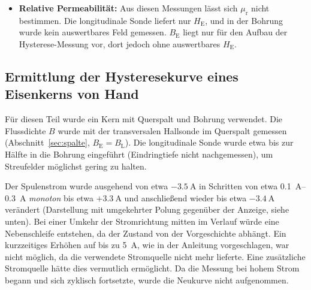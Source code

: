 \documentclass[a4paper,11pt]{article}
\begin{document}
\begin{itemize}
        sind nur durch wenige Punkte aufgelöst, und unmittelbar neben dem Maximum
        fällt die Kurve zwischen $-5{,}5$ und $\SI{-5}{\centi\meter}$ um bis zu etwa
        \SI{44}{\milli\tesla\per\centi\meter} ab. Ein Positionsfehler von
        $\SI{0.05}{\centi\meter}$ entspräche dort etwa $\SI{2}{\milli\tesla}$. Das
        wahre Maximum kann außerdem zwischen zwei Messpunkten liegen. Das ändert
        nichts am Gesamtbild. Da die Kernlänge nicht bestimmt wurde, kann die
        Lage der Maxima relativ zu den Kernenden nicht quantitativ diskutiert
        werden.
  \item \textbf{Relative Permeabilität:} Aus diesen Messungen lässt sich
        $\mu_\mathrm{r}$ nicht bestimmen. Die longitudinale Sonde liefert nur
        $H_\mathrm{E}$, und in der Bohrung wurde kein auswertbares Feld
        gemessen. $B_\mathrm{E}$ liegt nur für den Aufbau der
        Hysterese-Messung vor, dort jedoch ohne auswertbares $H_\mathrm{E}$.
\end{itemize}

\subsection{Ermittlung der Hysteresekurve eines Eisenkerns \glqq von Hand\grqq}
\label{sec:hyst}
Für diesen Teil wurde ein Kern mit Querspalt und Bohrung verwendet.
Die Flussdichte $B$ wurde mit der transversalen Hallsonde im Querspalt gemessen
(Abschnitt~\ref{sec:spalte}, $B_\mathrm{E}=B_\mathrm{L}$). Die longitudinale Sonde
wurde etwa bis zur Hälfte in die Bohrung eingeführt (Eindringtiefe nicht
nachgemessen), um Streufelder möglichst gering zu halten.

Der Spulenstrom wurde ausgehend von etwa $-\SI{3.5}{\ampere}$ in Schritten von
etwa \SIrange{0.1}{0.3}{\ampere} \emph{monoton} bis etwa $+\SI{3.3}{\ampere}$ und
anschließend wieder bis etwa $-\SI{3.4}{\ampere}$ verändert (Darstellung mit
umgekehrter Polung gegenüber der Anzeige, siehe unten). Bei einer Umkehr der
Stromrichtung mitten im Verlauf würde eine Nebenschleife entstehen, da der
Zustand von der Vorgeschichte abhängt. Ein kurzzeitiges Erhöhen auf bis zu
\SI{5}{\ampere}, wie in der Anleitung vorgeschlagen, war nicht möglich, da die
verwendete Stromquelle nicht mehr lieferte. Eine zusätzliche Stromquelle hätte
dies vermutlich ermöglicht. Da die Messung bei hohem Strom begann und sich zyklisch
fortsetzte, wurde die Neukurve nicht aufgenommen.
\end{document}
